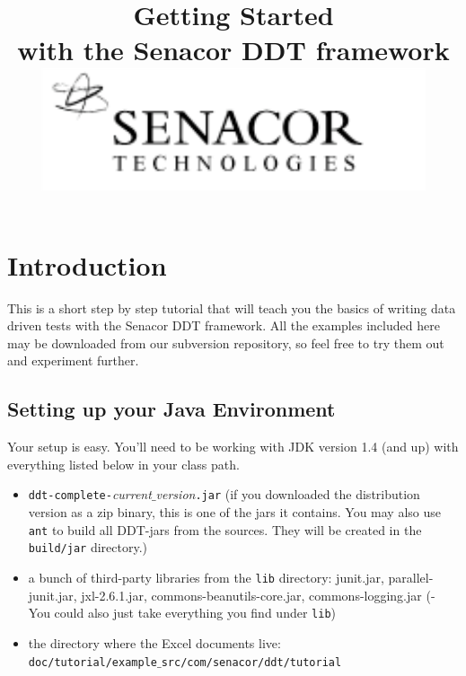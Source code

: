 


\title{Getting Started\\with the Senacor DDT framework\\ \vskip 0.5cm \includegraphics[scale=0.5]{image/logo.pdf}}

\maketitle \tableofcontents
\thispagestyle{empty}


\section{Introduction} %
\label{sec:introductioin}

This is a short step by step tutorial that will teach you the basics of writing data driven tests with the Senacor \textsf{DDT} framework. All the examples included here may be downloaded from our subversion repository, so feel free to try them out and experiment further.


\subsection{Setting up your Java Environment} %
\label{sec:setting_things_up}

Your setup is easy. You'll need to be working with JDK version 1.4 (and up) with everything listed below in your class path.
\begin{itemize}
	\item \texttt{ddt-complete-}\emph{current$\_$version}\texttt{.jar} (if you downloaded the distribution version as a zip binary, this is one of the jars it contains. You may also use \texttt{ant} to build all \textsf{DDT}-jars from the sources. They will be created in the \texttt{build/jar} directory.)

	\item a bunch of third-party libraries from the \texttt{lib} directory: junit.jar, parallel-junit.jar, jxl-2.6.1.jar, commons-beanutils-core.jar, commons-logging.jar (- You could also just take everything you find under \texttt{lib})
	
	\item the directory where the Excel documents live: \\ \texttt{doc/tutorial/example$\_$src/com/senacor/ddt/tutorial}
	
\end{itemize}


